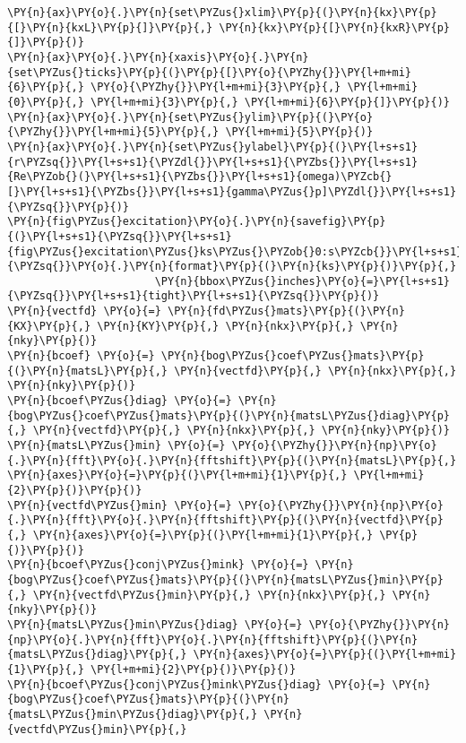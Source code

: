 \begin{Verbatim}[commandchars=\\\{\}]
\PY{n}{ax}\PY{o}{.}\PY{n}{set\PYZus{}xlim}\PY{p}{(}\PY{n}{kx}\PY{p}{[}\PY{n}{kxL}\PY{p}{]}\PY{p}{,} \PY{n}{kx}\PY{p}{[}\PY{n}{kxR}\PY{p}{]}\PY{p}{)}
\PY{n}{ax}\PY{o}{.}\PY{n}{xaxis}\PY{o}{.}\PY{n}{set\PYZus{}ticks}\PY{p}{(}\PY{p}{[}\PY{o}{\PYZhy{}}\PY{l+m+mi}{6}\PY{p}{,} \PY{o}{\PYZhy{}}\PY{l+m+mi}{3}\PY{p}{,} \PY{l+m+mi}{0}\PY{p}{,} \PY{l+m+mi}{3}\PY{p}{,} \PY{l+m+mi}{6}\PY{p}{]}\PY{p}{)}
\PY{n}{ax}\PY{o}{.}\PY{n}{set\PYZus{}ylim}\PY{p}{(}\PY{o}{\PYZhy{}}\PY{l+m+mi}{5}\PY{p}{,} \PY{l+m+mi}{5}\PY{p}{)}
\PY{n}{ax}\PY{o}{.}\PY{n}{set\PYZus{}ylabel}\PY{p}{(}\PY{l+s+s1}{r\PYZsq{}}\PY{l+s+s1}{\PYZdl{}}\PY{l+s+s1}{\PYZbs{}}\PY{l+s+s1}{Re\PYZob{}(}\PY{l+s+s1}{\PYZbs{}}\PY{l+s+s1}{omega)\PYZcb{}[}\PY{l+s+s1}{\PYZbs{}}\PY{l+s+s1}{gamma\PYZus{}p]\PYZdl{}}\PY{l+s+s1}{\PYZsq{}}\PY{p}{)}
\PY{n}{fig\PYZus{}excitation}\PY{o}{.}\PY{n}{savefig}\PY{p}{(}\PY{l+s+s1}{\PYZsq{}}\PY{l+s+s1}{fig\PYZus{}excitation\PYZus{}ks\PYZus{}\PYZob{}0:s\PYZcb{}}\PY{l+s+s1}{\PYZsq{}}\PY{o}{.}\PY{n}{format}\PY{p}{(}\PY{n}{ks}\PY{p}{)}\PY{p}{,}
                       \PY{n}{bbox\PYZus{}inches}\PY{o}{=}\PY{l+s+s1}{\PYZsq{}}\PY{l+s+s1}{tight}\PY{l+s+s1}{\PYZsq{}}\PY{p}{)}
\PY{n}{vectfd} \PY{o}{=} \PY{n}{fd\PYZus{}mats}\PY{p}{(}\PY{n}{KX}\PY{p}{,} \PY{n}{KY}\PY{p}{,} \PY{n}{nkx}\PY{p}{,} \PY{n}{nky}\PY{p}{)}
\PY{n}{bcoef} \PY{o}{=} \PY{n}{bog\PYZus{}coef\PYZus{}mats}\PY{p}{(}\PY{n}{matsL}\PY{p}{,} \PY{n}{vectfd}\PY{p}{,} \PY{n}{nkx}\PY{p}{,} \PY{n}{nky}\PY{p}{)}
\PY{n}{bcoef\PYZus{}diag} \PY{o}{=} \PY{n}{bog\PYZus{}coef\PYZus{}mats}\PY{p}{(}\PY{n}{matsL\PYZus{}diag}\PY{p}{,} \PY{n}{vectfd}\PY{p}{,} \PY{n}{nkx}\PY{p}{,} \PY{n}{nky}\PY{p}{)}
\PY{n}{matsL\PYZus{}min} \PY{o}{=} \PY{o}{\PYZhy{}}\PY{n}{np}\PY{o}{.}\PY{n}{fft}\PY{o}{.}\PY{n}{fftshift}\PY{p}{(}\PY{n}{matsL}\PY{p}{,} \PY{n}{axes}\PY{o}{=}\PY{p}{(}\PY{l+m+mi}{1}\PY{p}{,} \PY{l+m+mi}{2}\PY{p}{)}\PY{p}{)}
\PY{n}{vectfd\PYZus{}min} \PY{o}{=} \PY{o}{\PYZhy{}}\PY{n}{np}\PY{o}{.}\PY{n}{fft}\PY{o}{.}\PY{n}{fftshift}\PY{p}{(}\PY{n}{vectfd}\PY{p}{,} \PY{n}{axes}\PY{o}{=}\PY{p}{(}\PY{l+m+mi}{1}\PY{p}{,} \PY{p}{)}\PY{p}{)}
\PY{n}{bcoef\PYZus{}conj\PYZus{}mink} \PY{o}{=} \PY{n}{bog\PYZus{}coef\PYZus{}mats}\PY{p}{(}\PY{n}{matsL\PYZus{}min}\PY{p}{,} \PY{n}{vectfd\PYZus{}min}\PY{p}{,} \PY{n}{nkx}\PY{p}{,} \PY{n}{nky}\PY{p}{)}
\PY{n}{matsL\PYZus{}min\PYZus{}diag} \PY{o}{=} \PY{o}{\PYZhy{}}\PY{n}{np}\PY{o}{.}\PY{n}{fft}\PY{o}{.}\PY{n}{fftshift}\PY{p}{(}\PY{n}{matsL\PYZus{}diag}\PY{p}{,} \PY{n}{axes}\PY{o}{=}\PY{p}{(}\PY{l+m+mi}{1}\PY{p}{,} \PY{l+m+mi}{2}\PY{p}{)}\PY{p}{)}
\PY{n}{bcoef\PYZus{}conj\PYZus{}mink\PYZus{}diag} \PY{o}{=} \PY{n}{bog\PYZus{}coef\PYZus{}mats}\PY{p}{(}\PY{n}{matsL\PYZus{}min\PYZus{}diag}\PY{p}{,} \PY{n}{vectfd\PYZus{}min}\PY{p}{,}

\end{Verbatim}
